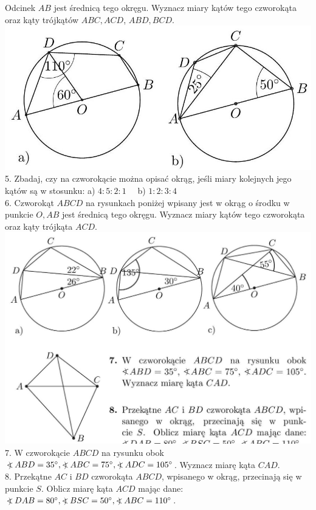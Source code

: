 \documentclass[10pt]{article}
\newcommand\Varangle{\mathop{{<\!\!\!\!\!\text{\small)}}\:}\nolimits}
\begin{document}
Odcinek \(A B\) jest średnicą tego okręgu. Wyznacz miary kątów tego czworokąta oraz kąty trójkątów \(A B C, A C D\), \(A B D, B C D\).\\
\includegraphics[max width=\textwidth, center]{2024_11_21_71f62bd117d375398909g-199(1)}\\
5. Zbadaj, czy na czworokącie można opisać okrąg, jeśli miary kolejnych jego kątów są w stosunku: a) \(4: 5: 2: 1 \quad\) b) \(1: 2: 3: 4\)\\
6. Czworokąt \(A B C D\) na rysunkach poniżej wpisany jest w okrąg o środku w punkcie \(O, A B\) jest średnicą tego okręgu. Wyznacz miary kątów tego czworokąta oraz kąty trójkąta \(A C D\).\\
\includegraphics[max width=\textwidth, center]{2024_11_21_71f62bd117d375398909g-200(1)}\\
7. W czworokącie \(A B C D\) na rysunku obok \(\Varangle A B D=35^{\circ}, \Varangle A B C=75^{\circ}, \Varangle A D C=105^{\circ}\). Wyznacz miarę kąta \(C A D\).\\
8. Przekątne \(A C\) i \(B D\) czworokąta \(A B C D\), wpisanego w okrąg, przecinają się w punkcie \(S\). Oblicz miarę kąta \(A C D\) mając dane: \(\Varangle D A B=80^{\circ}, \Varangle B S C=50^{\circ}, \Varangle A B C=110^{\circ}\).\\
\end{document}

